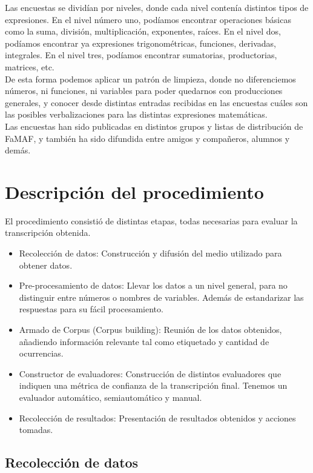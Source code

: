 Las encuestas se dividían por niveles, donde cada nivel contenía distintos tipos de expresiones.
En el nivel número uno, podíamos encontrar operaciones básicas como la suma, división, multiplicación, exponentes, raíces.
En el nivel dos, podíamos encontrar ya expresiones trigonométricas, funciones, derivadas, integrales.
En el nivel tres, podíamos encontrar sumatorias, productorias, matrices, etc.\\

De esta forma podemos aplicar un patrón de limpieza, donde no diferenciemos números, ni funciones, ni variables para poder quedarnos con producciones generales, y conocer desde distintas entradas recibidas en las encuestas cuáles son las posibles verbalizaciones para las distintas expresiones matemáticas.\\

Las encuestas han sido publicadas en distintos grupos y listas de distribución de FaMAF, y también ha sido difundida entre amigos y compañeros, alumnos y demás.

\section{Descripción del procedimiento}

El procedimiento consistió de distintas etapas, todas necesarias para evaluar la transcripción obtenida.

\begin{itemize}
\item Recolección de datos: Construcción y difusión del medio utilizado para obtener datos.
\item Pre-procesamiento de datos: Llevar los datos a un nivel general, para no distinguir entre números o nombres de variables. Además de estandarizar las respuestas para su fácil procesamiento.
\item Armado de Corpus (Corpus building): Reunión de los datos obtenidos, añadiendo información relevante tal como etiquetado y cantidad de ocurrencias.
\item Constructor de evaluadores: Construcción de distintos evaluadores que indiquen una métrica de confianza de la transcripción final. Tenemos un evaluador automático, semiautomático y manual.
\item Recolección de resultados: Presentación de resultados obtenidos y acciones tomadas.
\end{itemize}

\subsection{Recolección de datos}

